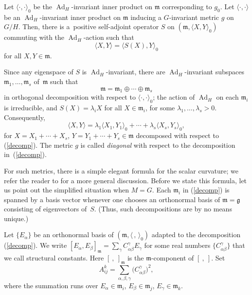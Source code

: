 \documentclass[pdftex]{sigma}
\begin{document}
Let $\langle \cdot, \cdot \rangle_0$ be the $\operatorname{Ad}_H$-invariant inner product on $\mathfrak{m}$ corresponding to $g_0$. Let $\langle \cdot, \cdot \rangle$ be an $\operatorname{Ad}_H$-invariant inner product on $\mathfrak{m}$ inducing a $G$-invariant metric $g$ on $G/H$. Then, there is a~positive self-adjoint operator $S$ on $(\mathfrak{m},\langle X,Y\rangle_0)$ commuting with the $\operatorname{Ad}_H$-action such that
\[ \langle X,Y\rangle=\langle S(X),Y\rangle_0\]
for all $X,Y\in \mathfrak{m}$.

Since any eigenspace of $S$ is $\operatorname{Ad}_H$-invariant, there are $\operatorname{Ad}_H$-invariant subspaces $\mathfrak{m}_1, \dots , \mathfrak{m}_s$ of~$\mathfrak{m}$ such that
\begin{equation} \label{decomp}
\mathfrak{m} = \mathfrak{m}_1 \oplus \cdots \oplus \mathfrak{m}_s
\end{equation}
in orthogonal decomposition with respect to $\langle \cdot, \cdot \rangle_0$; the action of $\operatorname{Ad}_H$ on each $\mathfrak{m}_i$ is irreducible, and $S(X)=\lambda_i X$ for all $X\in\mathfrak{m}_i$, for some $\lambda_1,\dots,\lambda_s>0$. Consequently,
\[
\langle X,Y\rangle=\lambda_1 \langle X_1,Y_1\rangle_0 + \cdots + \lambda_s \langle X_s,Y_s\rangle_0,
\]
for $X=X_1+\cdots+X_s$, $Y=Y_1+\cdots+Y_s\in \mathfrak{m}$ decomposed with
respect to (\ref{decomp}). The metric $g$ is called \textit{diagonal} with respect to
the decomposition in~(\ref{decomp}).

For such metrics, there is a simple elegant formula for the scalar curvature; we refer the reader to \cite{12} for a more general discussion. Before we state this formula, let us point out the simplified situation when $M=G$.
Each $\mathfrak{m}_i$ in (\ref{decomp}) is spanned by a basis vector whenever one chooses an orthonormal basis of $\mathfrak{m}=\mathfrak{g}$ consisting of eigenvectors of~$S$. (Thus, such decompositions are by no means unique.)

 Let $\{E_{\alpha}\}$ be an orthonormal basis of $(\mathfrak{m}, \langle \,,\,\rangle_0)$ adapted to the decomposition (\ref{decomp}). We write $[E_{\alpha},E_{\beta}]_{\mathfrak{m}}=\sum_{\gamma} C_{\alpha\beta}^{\gamma}E_{\gamma}$ for some real numbers $\big\{ C_{\alpha\beta}^{\gamma} \big\}$ that we call structural constants. Here $[\ ,\ ]_{\mathfrak{m}}$ is the $\mathfrak{m}$-component of $[\ , \ ]$.
Set
\[ A_{ij}^{k}=\sum_{\alpha,\beta,\gamma}\big(C_{\alpha\beta}^{\gamma}\big)^2,\]
where the summation runs over $E_{\alpha} \in \mathfrak{m}_i$, $E_{\beta} \in \mathfrak{m}_j$, $E_{\gamma} \in \mathfrak{m}_k$.
\end{document}
